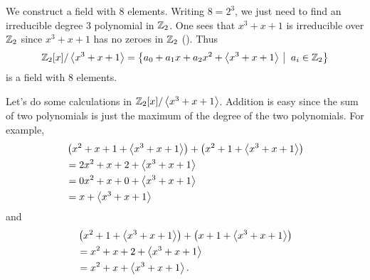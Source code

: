 \begin{example}
    We construct a field with 8 elements. Writing $8 = 2^3$, we just need to find an irreducible degree 3 polynomial in $\mathbb{Z}_2$. One sees that $x^3 + x + 1$ is irreducible over $\mathbb{Z}_2$ since $x^3 + x + 1$ has no zeroes in $\mathbb{Z}_2$ (). Thus
    \[
        \Z_2[x]/\princ{x^3+x+1} = \left\{a_0 + a_1x + a_2x^2 + \princ{x^3+x+1} \vert a_i \in \Z_2\right\}
    \]
    is a field with 8 elements.

    Let's do some calculations in $\mathbb{Z}_2[x]/\left\langle x^3+x+1\right\rangle$. Addition is easy since the sum of two polynomials is just the maximum of the degree of the two polynomials. For example,
    \begin{align*}
        &\left(x^2 + x + 1 + \left\langle x^3 + x + 1\right\rangle\right) + \left(x^2 + 1 + \left\langle x^3 + x + 1\right\rangle\right)\\
        &= 2x^2 + x + 2 + \left\langle x^3 + x + 1\right\rangle\\
        &= 0x^2 + x + 0 + \left\langle x^3 + x + 1\right\rangle\\
        &= x + \left\langle x^3 + x + 1\right\rangle
    \end{align*}
    and
    \begin{align*}
        &\left(x^2 + 1 + \left\langle x^3 + x + 1\right\rangle\right) + \left(x + 1 + \left\langle x^3 + x + 1\right\rangle\right)\\
        &= x^2 + x + 2 + \left\langle x^3 + x + 1\right\rangle\\
        &= x^2 + x + \left\langle x^3 + x + 1\right\rangle.
    \end{align*}


\end{example}

